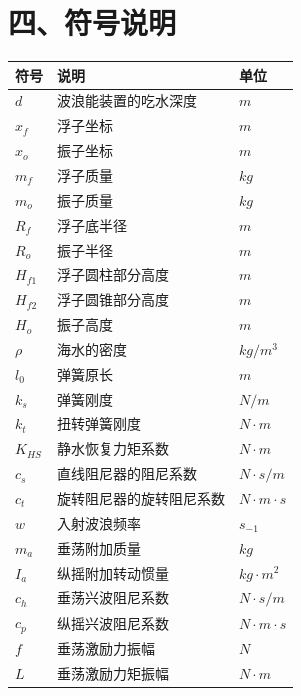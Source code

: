 \documentclass{my_paper}
\begin{document}
\section{四、符号说明}
\begin{table}[h]%
    \centering
    \begin{tabular}{p{2.0cm}<{\centering}p{9.0cm}<{\centering}p{2.0cm}<{\centering}}
    \hline
    符号 & 说明 & 单位 \\ %
    \hline
    $d$       &波浪能装置的吃水深度& $m$  \\
    $x_{f}$       &浮子坐标& $m$ \\
    $x_{o}$       &振子坐标&  $m$ \\
    $m_{f}$       &浮子质量&  $kg$ \\ %
    $m_{o}$       &振子质量&  $kg$ \\ %
    $R_{f}$       &浮子底半径&  $m$ \\
    $R_{o}$       &振子半径&  $m$ \\ %
    $H_{f1}$       &浮子圆柱部分高度&  $m$ \\
    $H_{f2}$       &浮子圆锥部分高度&  $m$ \\
    $H_{o}$       &振子高度&  $m$ \\
    $\rho$       &海水的密度&  $kg/m^{3}$ \\
    $l_{0}$       &弹簧原长&  $m$ \\
    $k_{s}$       &弹簧刚度&  $N/m$ \\
    $k_{t}$       &扭转弹簧刚度&  $N\cdot m$ \\
    $K_{HS}$       &静水恢复力矩系数&  $N\cdot m$ \\
    $c_{s}$       &直线阻尼器的阻尼系数&  $N\cdot s/m$ \\
    $c_{t}$       &旋转阻尼器的旋转阻尼系数&  $N\cdot m\cdot s$ \\
    $w$       &入射波浪频率&  $s_{-1}$ \\
    $m_{a}$       &垂荡附加质量&  $kg$ \\
    $I_{a}$       &纵摇附加转动惯量&  $kg\cdot m^{2}$ \\
    $c_{h}$       &垂荡兴波阻尼系数&  $N\cdot s/m$ \\
    $c_{p}$       &纵摇兴波阻尼系数&  $N\cdot m\cdot s$ \\
    $f$       &垂荡激励力振幅&  $N$ \\
    $L$       &垂荡激励力矩振幅&  $N\cdot m$ \\
    \hline
    \end{tabular}
\end{table}
\end{document}
